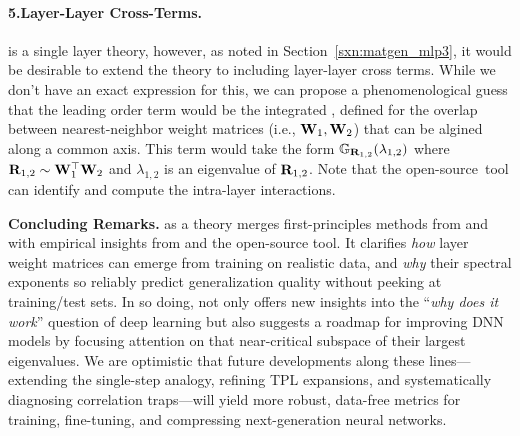 \paragraph{5.\quad Layer-Layer Cross-Terms.}
\SETOL is a single layer theory, however, as noted in Section~\ref{sxn:matgen_mlp3}, it would 
be desirable to extend the theory to including layer-layer cross terms.
While we don't have an exact expression for this, we can propose a phenomenological guess
that the leading order term would be the integrated \RTransform,
defined for the overlap between nearest-neighbor weight matrices
(i.e., ${\mathbf{W}}_{1},{\mathbf{W}}_{2}$) that can be algined along a common axis.
This term would take the form $\mathbb{G}_{\mathbf{R}_{1,2}}(\lambda_{1,2})$
where $\mathbf{R}_{1,2}\sim{\mathbf{W}}_{1}^{\top}{\mathbf{W}}_{2}$ and $\lambda_{1,2}$ is an
eigenvalue of $\mathbf{R}_{1,2}$.  Note that the open-source~\WW tool can
identify and compute the intra-layer interactions.\cite{WW}



\vspace{1em}
\noindent
\textbf{Concluding Remarks.}
\SETOL as a \SemiEmpirical theory merges first-principles methods from \STATMECH and \RMT with empirical 
insights from \HTSR and the open-source \WW tool. It clarifies \emph{how} \HeavyTailed  layer weight 
matrices can emerge from training on realistic data, and \emph{why} their spectral exponents so reliably 
predict generalization quality without peeking at training/test sets. In so doing, \SETOL not only offers 
new insights into the “\emph{why does it work}” question of deep learning but also suggests a roadmap for 
improving DNN models by focusing attention on that near-critical subspace of their largest 
eigenvalues. We are optimistic that future developments along these lines---extending the single-step 
\RenormalizationGroup analogy, refining TPL expansions, and systematically diagnosing correlation 
traps---will yield more robust, data-free metrics for training, fine-tuning, and compressing next-generation 
neural networks. 
